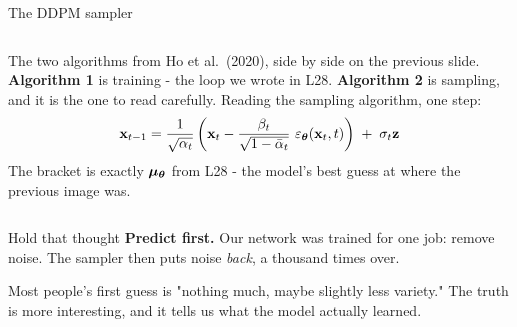 \documentclass[aspectratio=169]{beamer}
\begin{document}
\begin{frame}{The DDPM sampler}
  \small
  \begin{columns}[T]
    \footnotesize
    The two algorithms from Ho et al.\ (2020), side by side on the previous slide.
    \vskip 4pt
    \textbf{Algorithm 1} is training - the loop we wrote in L28.
    \vskip 4pt
    \textbf{Algorithm 2} is sampling, and it is the one to read carefully.
    \footnotesize
    Reading the sampling algorithm, one step:
    \[
      \mathbf{x}_{t-1} = \frac{1}{\sqrt{\alpha_t}}\left(\mathbf{x}_t - \frac{\beta_t}{\sqrt{1-\bar\alpha_t}}\ \varepsilon_{\bm{\theta}}(\mathbf{x}_t,t)\right)
        \;+\; \sigma_t \mathbf{z}
    \]
    \vskip 3pt
    The bracket is exactly $\bm\mu_{\bm{\theta}}$ from L28 - the model's best guess at where
    the previous image was.
    \vskip 5pt
  \end{columns}
\end{frame}

\begin{frame}{Hold that thought}
  \small
  \textbf{Predict first.} Our network was trained for one job: remove noise. The sampler
  then puts noise \emph{back}, a thousand times over.
  \vskip 8pt
  \begin{center}
  \end{center}
  \vskip 8pt
  \small
  Most people's first guess is "nothing much, maybe slightly less variety." The truth is
  more interesting, and it tells us what the model actually learned.
  \vskip 6pt
\end{frame}
\end{document}
